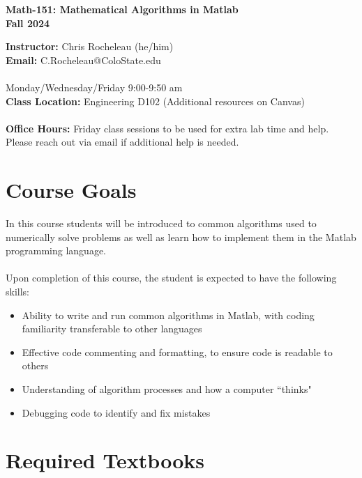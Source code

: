 \documentclass[11pt]{article}
\begin{document}
\begin{center}
\Large{\textbf{Math-151:  Mathematical Algorithms in Matlab}}\\
\textbf{Fall 2024}
\end{center}
\medskip
\textbf{Instructor:} Chris Rocheleau (he/him) \\
\textbf{Email:} C.Rocheleau@ColoState.edu\\
\\
 Monday/Wednesday/Friday 9:00-9:50 am\\
\textbf{Class Location:} Engineering D102 (Additional resources on Canvas)\\
\\
\textbf{Office Hours:} Friday class sessions to be used for extra lab time and help. Please reach out via email if additional help is needed.

\noindent\makebox[\linewidth]{\rule{\textwidth}{0.4pt}}


\section*{Course Goals}
\noindent In this course students will be introduced to common algorithms used to numerically solve problems as well as learn how to implement them in the Matlab programming language. \\
\\
\noindent Upon completion of this course, the student is expected to have the following skills:
\begin{itemize}
	\item Ability to write and run common algorithms in Matlab, with coding familiarity transferable to other languages
	\item Effective code commenting and formatting, to ensure code is readable to others
	\item Understanding of algorithm processes and how a computer ``thinks"
	\item Debugging code to identify and fix mistakes
\end{itemize}




\section*{Required Textbooks}
\end{document}
